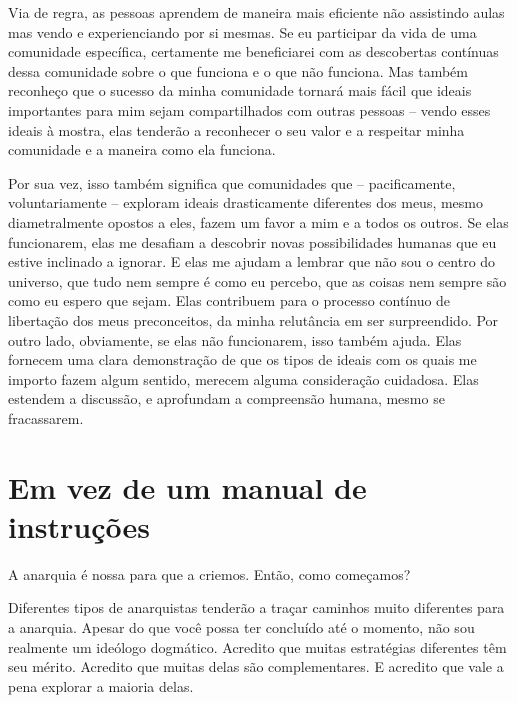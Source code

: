 Via de regra, as pessoas aprendem de maneira mais eficiente não assistindo aulas mas vendo e experienciando por si mesmas. Se eu participar da vida de uma comunidade específica, certamente me beneficiarei com as descobertas contínuas dessa comunidade sobre o que funciona e o que não funciona. Mas também reconheço que o sucesso da minha comunidade tornará mais fácil que ideais importantes para mim sejam compartilhados com outras pessoas -- vendo esses ideais à mostra, elas tenderão a reconhecer o seu valor e a respeitar minha comunidade e a maneira como ela funciona.

Por sua vez, isso também significa que comunidades que -- pacificamente, voluntariamente -- exploram ideais drasticamente diferentes dos meus, mesmo diametralmente opostos a eles, fazem um favor a mim e a todos os outros. Se elas funcionarem, elas me desafiam a descobrir novas possibilidades humanas que eu estive inclinado a ignorar. E elas me ajudam a lembrar que não sou o centro do universo, que tudo nem sempre é como eu percebo, que as coisas nem sempre são como eu espero que sejam. Elas contribuem para o processo contínuo de libertação dos meus preconceitos, da minha relutância em ser surpreendido. Por outro lado, obviamente, se elas não funcionarem, isso também ajuda. Elas fornecem uma clara demonstração de que os tipos de ideais com os quais me importo fazem algum sentido, merecem alguma consideração cuidadosa. Elas estendem a discussão, e aprofundam a compreensão humana, mesmo se fracassarem.

\section{Em vez de um manual de instruções}

A anarquia é nossa para que a criemos. Então, como começamos?

Diferentes tipos de anarquistas tenderão a traçar caminhos muito diferentes para a anarquia. Apesar do que você possa ter concluído até o momento, não sou realmente um ideólogo dogmático. Acredito que muitas estratégias diferentes têm seu mérito. Acredito que muitas delas são complementares. E acredito que vale a pena explorar a maioria delas.

